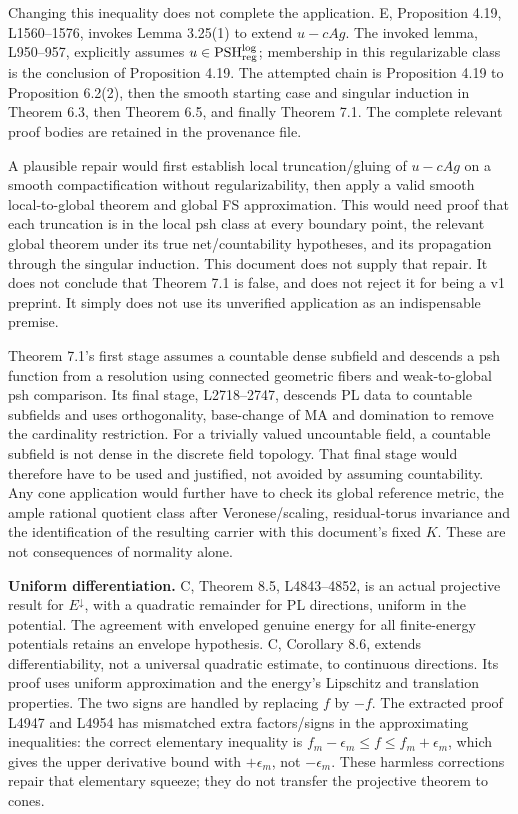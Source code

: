 \documentclass[
  11pt,
]{article}
\begin{document}
Changing this inequality does not complete the application. E,
Proposition 4.19, L1560--1576, invokes Lemma 3.25(1) to extend
\(u-cAg\). The invoked lemma, L950--957, explicitly assumes
\(u\in\operatorname{PSH}^{\log}_{\rm reg}\); membership in this
regularizable class is the conclusion of Proposition 4.19. The attempted
chain is Proposition 4.19 to Proposition 6.2(2), then the smooth
starting case and singular induction in Theorem 6.3, then Theorem 6.5,
and finally Theorem 7.1. The complete relevant proof bodies are retained
in the provenance file.

A plausible repair would first establish local truncation/gluing of
\(u-cAg\) on a smooth compactification without regularizability, then
apply a valid smooth local-to-global theorem and global FS
approximation. This would need proof that each truncation is in the
local psh class at every boundary point, the relevant global theorem
under its true net/countability hypotheses, and its propagation through
the singular induction. This document does not supply that repair. It
does not conclude that Theorem 7.1 is false, and does not reject it for
being a v1 preprint. It simply does not use its unverified application
as an indispensable premise.

Theorem 7.1's first stage assumes a countable dense subfield and
descends a psh function from a resolution using connected geometric
fibers and weak-to-global psh comparison. Its final stage, L2718--2747,
descends PL data to countable subfields and uses orthogonality,
base-change of MA and domination to remove the cardinality restriction.
For a trivially valued uncountable field, a countable subfield is not
dense in the discrete field topology. That final stage would therefore
have to be used and justified, not avoided by assuming countability. Any
cone application would further have to check its global reference
metric, the ample rational quotient class after Veronese/scaling,
residual-torus invariance and the identification of the resulting
carrier with this document's fixed \(K\). These are not consequences of
normality alone.

\textbf{Uniform differentiation.} C, Theorem 8.5, L4843--4852, is an
actual projective result for \(E^\downarrow\), with a quadratic
remainder for PL directions, uniform in the potential. The agreement
with enveloped genuine energy for all finite-energy potentials retains
an envelope hypothesis. C, Corollary 8.6, extends differentiability, not
a universal quadratic estimate, to continuous directions. Its proof uses
uniform approximation and the energy's Lipschitz and translation
properties. The two signs are handled by replacing \(f\) by \(-f\). The
extracted proof L4947 and L4954 has mismatched extra factors/signs in
the approximating inequalities: the correct elementary inequality is
\(f_m-\epsilon_m\leq f\leq f_m+\epsilon_m\), which gives the upper
derivative bound with \(+\epsilon_m\), not \(-\epsilon_m\). These
harmless corrections repair that elementary squeeze; they do not
transfer the projective theorem to cones.
\end{document}
